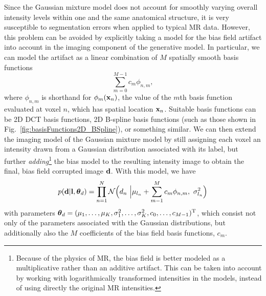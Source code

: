 \documentclass[10pt,twoside]{book}
\begin{document}
Since the Gaussian mixture model does not account for smoothly varying overall intensity levels within one and the same anatomical structure, it is 
very susceptible to segmentation errors when applied to typical MR data. However, this problem can be avoided
by explicitly taking a model for the bias field artifact into account in the imaging component of the generative model. In particular, we can model
the artifact as a linear combination of $M$ spatially smooth basis functions
\begin{equation}
  \sum_{m=0}^{M-1} c_m \phi_{n,m},
\end{equation}
where $\phi_{n,m}$ is shorthand for $\phi_m( \mathbf{x}_n )$, the value of the $m$th basis function evaluated at voxel $n$, which has spatial location $\mathbf{x}_n$.
Suitable basis functions can be 2D DCT basis functions, 2D B-spline basis functions (such as those shown in Fig.~\ref{fig:basisFunctions2D_BSpline}), or something similar.
We can then extend the imaging model of the Gaussian mixture model by still assigning each voxel an intensity drawn from a Gaussian distribution
associated with its label, but further \emph{adding}\footnote{Because of the physics of MR, the bias field is better modeled as a multiplicative rather than an additive artifact. This can be taken into account by working with logarithmically transformed intensities in the models, instead of using directly the original MR intensities.} the bias model to the resulting intensity image to obtain the final, bias field corrupted image $\mathbf{d}$.  With this model, we have
\begin{equation}
  p( \mathbf{d} | \mathbf{l}, {\mbox{\boldmath {${\theta}$}}}_d ) = \prod_{n=1}^N \mathcal N \mathnormal \!\, \Big( d_n \,\, \Big| \mu_{l_n} + \sum_{m-1}^M c_m \phi_{n,m}, \,\, \sigma_{l_n}^2 \Big) 
\end{equation}
with parameters ${\mbox{\boldmath {${\theta}$}}}_d = ( \mu_1, \ldots, \mu_K, \sigma_1^2, \ldots, \sigma_K^2, c_0, \ldots, c_{M-1})^\mathrm{T}$, which consist not only of the parameters associated with the Gaussian distributions, but additionally also the $M$ coefficients of the bias field basis functions, $c_m$. 
\end{document}
